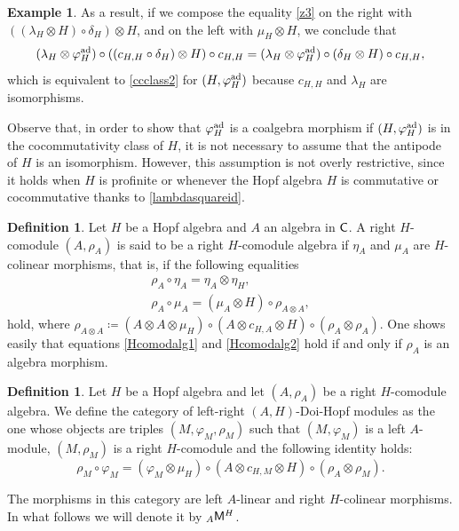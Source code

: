 \documentclass[11pt,reqno]{amsart}
\theoremstyle{plain}%
\theoremstyle{definition}
\newtheorem{definition}[theorem]{Definition}%
\newtheorem{example}[theorem]{Example}%
\theoremstyle{remark}
\begin{document}
\begin{example}
As a result, if we compose the equality \eqref{z3} on the right with $((\lambda_{H}\otimes H)\circ\delta_{H})\otimes H$, and on the left with $\mu_{H}\otimes H$, we conclude that 
\begin{gather*}
(\lambda_{H}\otimes\varphi_{H}^{{\rm ad}})\circ ((c_{H,H}\circ\delta_{H})\otimes H)\circ c_{H,H}=(\lambda_{H}\otimes\varphi_{H}^{{\rm ad}})\circ (\delta_{H}\otimes H)\circ c_{H,H},
\end{gather*}
which is equivalent to \eqref{ccclass2} for $(H,\varphi_{H}^{{\rm ad}})$ because $c_{H,H}$ and $\lambda_{H}$ are isomorphisms.

Observe that, in order to show that $\varphi_{H}^{{\rm ad}}$ is a coalgebra morphism if $(H,\varphi_{H}^{{\rm ad}})$ is in the cocommutativity class of $H$, it is not necessary to assume that the antipode of $H$ is an isomorphism. However, this assumption is not overly restrictive, since it holds when $H$ is profinite \cite[Corollary 1]{PuraE} or whenever the Hopf algebra $H$ is commutative or cocommutative thanks to \eqref{lambdasquareid}. 
\end{example}


\begin{definition}
	Let $H$ be a Hopf algebra and $A$ an algebra in ${\sf C}$. A right $H$-comodule $(A,\rho_{A})$ is said to be a right $H$-comodule algebra if $\eta_{A}$ and $\mu_{A}$ are $H$-colinear morphisms, that is, if the following equalities 
\begin{gather}
\label{Hcomodalg1}\rho_{A}\circ \eta_{A}=\eta_{A}\otimes \eta_{H},\\
\label{Hcomodalg2} \rho_{A}\circ \mu_{A}=(\mu_{A}\otimes H)\circ \rho_{A\otimes A},
\end{gather} 
hold, where $ \rho_{A\otimes A}\coloneqq(A\otimes A\otimes \mu_{H})\circ (A\otimes c_{H,A}\otimes H)\circ (\rho_{A}\otimes \rho_{A})$. One shows easily that equations \eqref{Hcomodalg1} and \eqref{Hcomodalg2} hold if and only if $\rho_{A}$ is an algebra morphism.
\end{definition}


\begin{definition}
Let $H$ be a Hopf algebra and let  $(A,\rho_{A})$  be a  right $H$-comodule  algebra. We define the category of left-right $(A,H)$-Doi-Hopf modules as the one whose objects are triples $(M, \varphi_{M}, \rho_{M})$ such that $(M, \varphi_{M})$ is a left $A$-module,  $(M, \rho_{M})$ is a right $H$-comodule and the following identity holds:
\begin{equation*}
\label{lrHopfmod}\rho_{M}\circ \varphi_{M}=(\varphi_{M}\otimes \mu_{H})\circ (A\otimes c_{H,M}\otimes H)\circ (\rho_{A}\otimes \rho_{M}).
\end{equation*} 

The morphisms in this category are left $A$-linear and right $H$-colinear morphisms. In what follows we will denote it by ${}_{A}{\sf M}^{H}$.
\end{definition}
\end{document}
